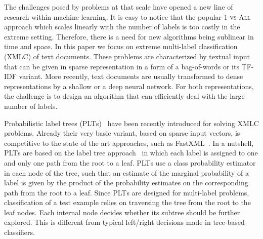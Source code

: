 \documentclass{article}
\newcommand{\Algo}[1]{\textsc{#1}}
\begin{document}
The challenges posed by problems at that scale have opened a new line of research within machine learning. It is easy to notice that the popular \Algo{1-vs-All} approach which scales linearly with the number of labels is too costly in the extreme setting. Therefore, there is a need for new algorithms being sublinear in time and space. 
%
In this paper we focus on extreme multi-label classification (XMLC) of text documents. These problems are characterized by textual input that can be given in sparse representation in a form of a bag-of-words or its TF-IDF variant. More recently, text documents are usually transformed to dense representations by a shallow or a deep neural network. For both representations, the challenge is to design an algorithm that can efficiently deal with the large number of labels.

Probabilistic label trees (\Algo{PLT}s)~\citep{Jasinska_et_al_2016} have been recently introduced for solving XMLC problems. Already their very basic variant, based on sparse input vectors, is competitive to the state of the art approaches, such as FastXML~\citep{Prabhu_Varma_2014}. In a nutshell, \Algo{PLT}s are based on the label tree approach~\cite{Beygelzimer_et_al_2009a,Bengio_et_al_2010,Deng_et_al_2011} in which each label is assigned to one and only one path from the root to a leaf. 
\Algo{PLT}s use a class probability estimator in each node of the tree, such that an estimate of the marginal probability of a label is given by the product of the probability estimates on the corresponding path from the root to a leaf.  Since \Algo{PLT}s are designed for multi-label problems, classification of a test example relies on traversing the tree from the root to the leaf nodes. Each internal node decides whether its subtree should be further explored. This is different from typical left/right decisions made in tree-based classifiers. 

%
\end{document}
